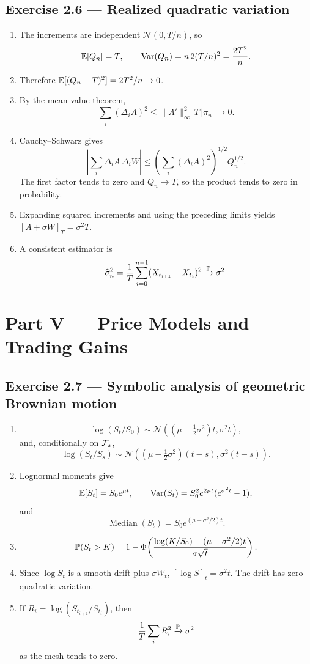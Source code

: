 \subsection*{Exercise 2.6 --- Realized quadratic variation}
\begin{enumerate}
  \item The increments are independent \(\mathcal N(0,T/n)\), so
  \[
  \mathbb{E}[Q_n]=T,
  \qquad
  \operatorname{Var}(Q_n)=n\,2(T/n)^2=\frac{2T^2}{n}.
  \]
  \item Therefore \(\mathbb{E}[(Q_n-T)^2]=2T^2/n\to0\).
  \item By the mean value theorem,
  \[
  \sum_i(\Delta_iA)^2
  \leq\|A'\|_\infty^2\,T\,|\pi_n|\longrightarrow0.
  \]
  \item Cauchy--Schwarz gives
  \[
  \left|\sum_i\Delta_iA\,\Delta_iW\right|
  \leq
  \left(\sum_i(\Delta_iA)^2\right)^{1/2}Q_n^{1/2}.
  \]
  The first factor tends to zero and \(Q_n\to T\), so the product tends to
  zero in probability.
  \item Expanding squared increments and using the preceding limits yields
  \([A+\sigma W]_T=\sigma^2T\).
  \item A consistent estimator is
  \[
  \widehat\sigma_n^2
  =\frac1T\sum_{i=0}^{n-1}(X_{t_{i+1}}-X_{t_i})^2
  \xrightarrow{\mathbb{P}}\sigma^2.
  \]
\end{enumerate}

\section*{Part V --- Price Models and Trading Gains}

\subsection*{Exercise 2.7 --- Symbolic analysis of geometric Brownian motion}
\begin{enumerate}
  \item
  \[
  \log(S_t/S_0)
  \sim\mathcal N\!\left((\mu-\tfrac12\sigma^2)t,\sigma^2t\right),
  \]
  and, conditionally on \(\mathcal{F}_s\),
  \[
  \log(S_t/S_s)
  \sim\mathcal N\!\left((\mu-\tfrac12\sigma^2)(t-s),
  \sigma^2(t-s)\right).
  \]
  \item Lognormal moments give
  \[
  \mathbb{E}[S_t]=S_0e^{\mu t},
  \qquad
  \operatorname{Var}(S_t)
  =S_0^2e^{2\mu t}(e^{\sigma^2t}-1),
  \]
  and
  \[
  \operatorname{Median}(S_t)
  =S_0e^{(\mu-\sigma^2/2)t}.
  \]
  \item
  \[
  \mathbb{P}(S_t>K)
  =1-\Phi\!\left(
  \frac{\log(K/S_0)-(\mu-\sigma^2/2)t}{\sigma\sqrt t}
  \right).
  \]
  \item Since \(\log S_t\) is a smooth drift plus \(\sigma W_t\),
  \([\log S]_t=\sigma^2t\). The drift has zero quadratic variation.
  \item If \(R_i=\log(S_{t_{i+1}}/S_{t_i})\), then
  \[
  \frac1T\sum_iR_i^2\xrightarrow{\mathbb{P}}\sigma^2
  \]
  as the mesh tends to zero.
\end{enumerate}

